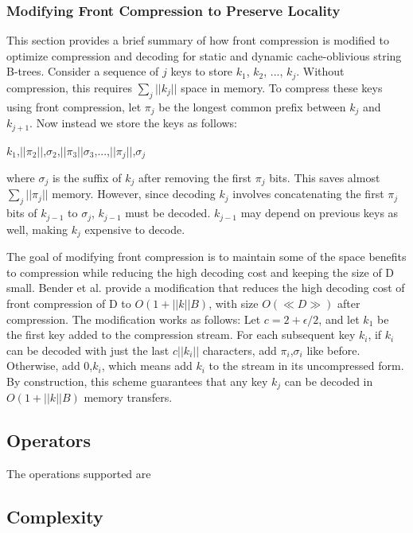 \documentclass{style}
\begin{document}
\subsubsection{Modifying Front Compression to Preserve Locality}
This section provides a brief summary of how front compression is modified to optimize compression and decoding for static and dynamic cache-oblivious string B-trees. Consider a sequence of $j$ keys to store $k_{1}$,  $k_{2}$, ...,  $k_{j}$. Without compression, this requires $\sum_{j}||k_{j}||$ space in memory. To compress these keys using front compression, let $\pi_{j}$ be the longest common prefix between $k_{j}$ and $k_{j+1}$. Now instead we store the keys as follows: 
\begin{center}
$k_{1}$,$||\pi_{2}||$,$\sigma_{2}$,$||\pi_{3}||$$\sigma_{3}$,...,$||\pi_{j}||$,$\sigma_{j}$
\end{center}
where $\sigma_{j}$ is the suffix of $k_{j}$ after removing the first $\pi_{j}$ bits. This saves almost $\sum_{j}||\pi_{j}||$ memory. However, since decoding $k_{j}$ involves concatenating the first $\pi_{j}$ bits of $k_{j-1}$ to $\sigma_{j}$, $k_{j-1}$ must be decoded. $k_{j-1}$ may depend on previous keys as well, making $k_{j}$ expensive to decode.

The goal of modifying front compression is to maintain some of the space benefits to compression while reducing the high decoding cost and keeping the size of D small. Bender et al.  provide a modification that reduces the high decoding cost of front compression of D to $O(1+||k||B)$, with size $O(\ll{D}\gg)$ after compression. The modification works as follows: Let $c = 2 + \epsilon/2$, and let $k_{1}$ be the first key added to the compression stream. For each subsequent key $k_{i}$, if $k_{i}$ can be decoded with just the last $c||k_{i}||$ characters, add $\pi_{i}$,$\sigma_{i}$ like before. Otherwise, add 0,$k_{i}$, which means add $k_{i}$ to the stream in its uncompressed form. By construction, this scheme guarantees that any key $k_{j}$ can be decoded in $O(1+||k||B)$ memory transfers.%
\subsection{Operators}
The operations supported are

\subsection{Complexity}
\end{document}
